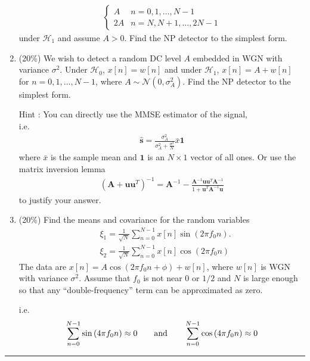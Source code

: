 \documentclass[a4paper,12pt]{article}
\begin{document}
\begin{enumerate}
\begin{align*}
\begin{cases}
                    A & n=0,1,\dots,N-1\\
                    2A & n=N,N+1,\dots,2N-1 
                    \end{cases}
            \end{align*}
            under $\mathcal H_1$ and assume $A>0$. Find the NP detector to the simplest form.
        \item(20\%) 
            We wish to detect a random DC level $A$ embedded in WGN with variance $\sigma^2$. Under $\mathcal H_0$, $x[n]=w[n]$ and under $\mathcal H_1$, $x[n]=A+w[n]$ for $n=0,1,\dots,N-1$, where $A\sim\mathcal N(0,\sigma_A^2)$. Find the NP detector to the simplest form.
            
            Hint : You can directly use the MMSE estimator of the signal,\\i.e.
            \begin{align*}
                \hat{\mathbf s}=\frac{\sigma_A^2}{\sigma_A^2+\frac{\sigma^2}{N}}\bar{x}\mathbf{1}
            \end{align*}
            where $\bar{x}$ is the sample mean and $\mathbf{1}$ is an $N\times1$ vector of all ones. Or use the matrix inversion lemma
            \begin{align*}
                \left(\textbf{A}+\textbf{u}\textbf{u}^T \right)^{-1}=\textbf{A}^{-1}-\frac{\textbf{A}^{-1}\textbf{u}\textbf{u}^T\textbf{A}^{-1}}{1+\textbf{u}^T\textbf{A}^{-1}\textbf{u}}
            \end{align*}
            to justify your answer.
        \item(20\%) 
            Find the means and covariance for the random variables
            \begin{align*}
                &\xi_1=\frac{1}{\sqrt{N}}\sum\limits_{n=0}^{N-1}x[n]\sin{\left(2\pi f_0n\right)}.\\
                &\xi_2=\frac{1}{\sqrt{N}}\sum\limits_{n=0}^{N-1}x[n]\cos{\left(2\pi f_0n\right)} 
            \end{align*}
            The data are $x[n]=A\cos{\left(2\pi f_0n+\phi\right)}+w[n]$, where $w[n]$ is WGN with variance $\sigma^2$. Assume that $f_0$ is not near 0 or $1/2$ and $N$ is large enough so that any ``double-frequency'' term can be approximated as zero.
            
            i.e.
            \begin{align*}
                \sum\limits_{n=0}^{N-1}\sin{(4\pi f_0n)}\approx 0\qquad{\rm and}\qquad\sum\limits_{n=0}^{N-1}\cos{(4\pi f_0n)}\approx 0
            \end{align*}
    \end{enumerate}
    \rule{\textwidth}{0.4pt}
\end{document}
